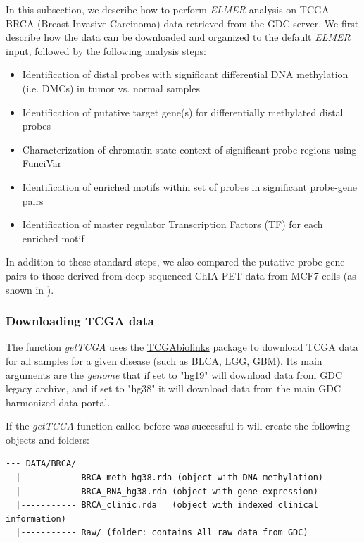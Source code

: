 In this subsection, we describe how to perform \textit{ELMER} analysis on TCGA BRCA
(Breast Invasive Carcinoma) data retrieved from the GDC server.
We first describe how the data can be downloaded and organized to
the default \textit{ELMER} input, followed by the following analysis steps:
\begin{itemize}
	\item Identification of distal probes with significant differential DNA methylation (i.e. DMCs) in tumor vs. normal samples
	\item Identification of putative target gene(s) for differentially methylated distal probes
  \item Characterization of chromatin state context of significant probe regions using FunciVar
	\item Identification of enriched motifs within set of probes in significant probe-gene pairs
	\item Identification of master regulator Transcription Factors (TF) for each enriched motif
\end{itemize}

In addition to these standard steps, we also compared the
putative probe-gene pairs to those derived from deep-sequenced ChIA-PET
data from MCF7 cells (as shown in ).

\subsubsection*{Downloading TCGA data}

The function \textit{getTCGA} uses the   \href{http://bioconductor.org/packages/TCGAbiolinks/}{TCGAbiolinks}
package \cite{colaprico2015tcgabiolinks} to download TCGA data for all samples
for a given disease (such as BLCA, LGG, GBM). Its main arguments are
the \textit{genome}  that if set to "hg19" will download data from GDC legacy archive, and if set
to "hg38" it will download data from the main GDC harmonized data portal.



If the \textit{getTCGA} function called before was successful it will
 create the following objects and folders:
\begin{verbatim}
--- DATA/BRCA/
  |----------- BRCA_meth_hg38.rda (object with DNA methylation)
  |----------- BRCA_RNA_hg38.rda (object with gene expression)
  |----------- BRCA_clinic.rda   (object with indexed clinical information)
  |----------- Raw/ (folder: contains All raw data from GDC)
\end{verbatim}

